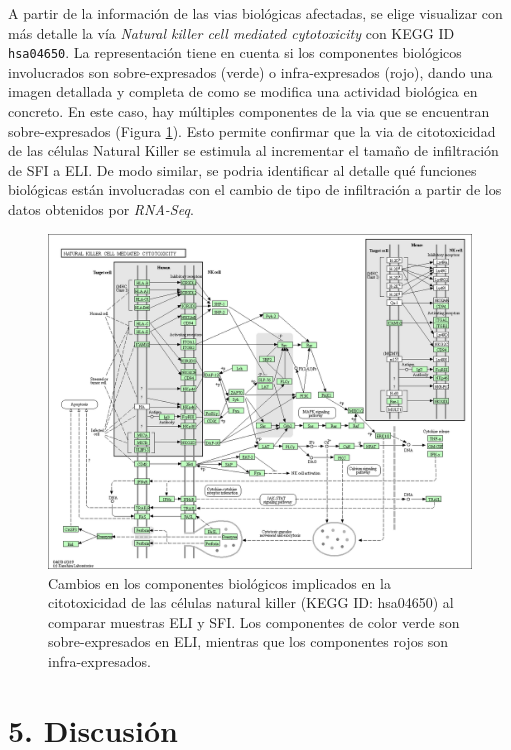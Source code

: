 \documentclass[
]{article}
\begin{document}
A partir de la información de las vias biológicas afectadas, se elige
visualizar con más detalle la vía \emph{Natural killer cell mediated
cytotoxicity} con KEGG ID \texttt{hsa04650}. La representación tiene en
cuenta si los componentes biológicos involucrados son sobre-expresados
(verde) o infra-expresados (rojo), dando una imagen detallada y completa
de como se modifica una actividad biológica en concreto. En este caso,
hay múltiples componentes de la via que se encuentran sobre-expresados
(Figura \ref{fig:Fig20}). Esto permite confirmar que la via de
citotoxicidad de las células Natural Killer se estimula al incrementar
el tamaño de infiltración de SFI a ELI. De modo similar, se podria
identificar al detalle qué funciones biológicas están involucradas con
el cambio de tipo de infiltración a partir de los datos obtenidos por
\emph{RNA-Seq}.

\begin{figure}

{\centering \includegraphics[width=0.8\linewidth]{results/7.KeggPathway/hsa04650} 

}

\caption{Cambios en los componentes biológicos implicados en la citotoxicidad de las células natural killer (KEGG ID: hsa04650) al comparar muestras ELI y SFI. Los componentes de color verde son sobre-expresados en ELI, mientras que los componentes rojos son infra-expresados. }\label{fig:Fig20}
\end{figure}

\newpage

\hypertarget{discusiuxf3n}{%
\section{5. Discusión}\label{discusiuxf3n}}
\end{document}
